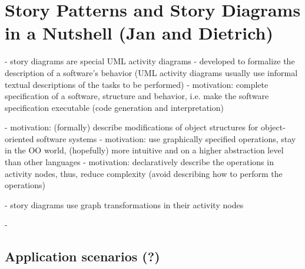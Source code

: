 \section{Story Patterns and Story Diagrams in a Nutshell (Jan and Dietrich)} \label{sec:Overview}


- story diagrams are special UML activity diagrams
- developed to formalize the description of a software's behavior (UML activity diagrams usually use informal textual descriptions of the tasks to be performed)
- motivation: complete specification of a software, structure and behavior, i.e. make the software specification executable (code generation and interpretation)

- motivation: (formally) describe modifications of object structures for object-oriented software systems
- motivation: use graphically specified operations, stay in the OO world, (hopefully) more intuitive and on a higher abstraction level than other languages
- motivation: declaratively describe the operations in activity nodes, thus, reduce complexity (avoid describing how to perform the operations)

- story diagrams use graph transformations in their activity nodes

- 





\subsection{Application scenarios (?)} \label{sec:Applications}